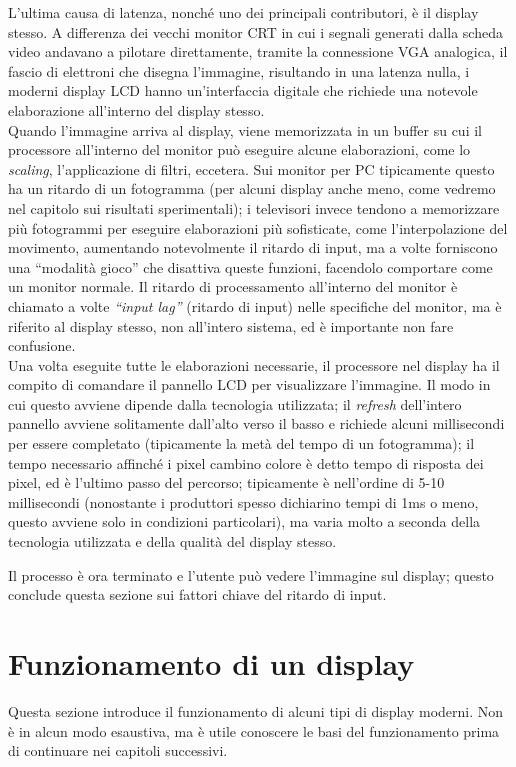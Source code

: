 L'ultima causa di latenza, nonché uno dei principali contributori, è il display stesso. A differenza dei vecchi monitor CRT in cui i segnali generati dalla scheda video andavano a pilotare direttamente, tramite la connessione VGA analogica, il fascio di elettroni che disegna l'immagine, risultando in una latenza nulla, i moderni display LCD hanno un'interfaccia digitale che richiede una notevole elaborazione all'interno del display stesso.\\
Quando l'immagine arriva al display, viene memorizzata in un buffer su cui il processore all'interno del monitor può eseguire alcune elaborazioni, come lo \textit{scaling}, l'applicazione di filtri, eccetera. Sui monitor per PC tipicamente questo ha un ritardo di un fotogramma (per alcuni display anche meno, come vedremo nel capitolo sui risultati sperimentali); i televisori invece tendono a memorizzare più fotogrammi per eseguire elaborazioni più sofisticate, come l'interpolazione del movimento, aumentando notevolmente il ritardo di input, ma a volte forniscono una ``modalità gioco'' che disattiva queste funzioni, facendolo comportare come un monitor normale. Il ritardo di processamento all'interno del monitor è chiamato a volte \textit{``input lag''} (ritardo di input) nelle specifiche del monitor, ma è riferito al display stesso, non all'intero sistema, ed è importante non fare confusione.\\
Una volta eseguite tutte le elaborazioni necessarie, il processore nel display ha il compito di comandare il pannello LCD per visualizzare l'immagine. Il modo in cui questo avviene dipende dalla tecnologia utilizzata; il \textit{refresh} dell'intero pannello avviene solitamente dall'alto verso il basso e richiede alcuni millisecondi per essere completato (tipicamente la metà del tempo di un fotogramma); il tempo necessario affinché i pixel cambino colore è detto tempo di risposta dei pixel, ed è l'ultimo passo del percorso; tipicamente è nell'ordine di 5-10 millisecondi (nonostante i produttori spesso dichiarino tempi di 1ms o meno, questo avviene solo in condizioni particolari), ma varia molto a seconda della tecnologia utilizzata e della qualità del display stesso.

Il processo è ora terminato e l'utente può vedere l'immagine sul display; questo conclude questa sezione sui fattori chiave del ritardo di input.

\section{Funzionamento di un display}
Questa sezione introduce il funzionamento di alcuni tipi di display moderni. Non è in alcun modo esaustiva, ma è utile conoscere le basi del funzionamento prima di continuare nei capitoli successivi.

